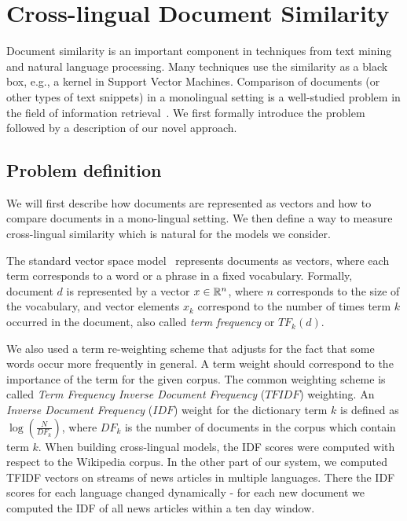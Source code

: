 %
\chapter{Cross-lingual Document Similarity}\label{chap:crosslingual}

Document similarity is an important component in techniques from text mining and natural language processing. 
Many techniques use the similarity as a black box, e.g., a kernel in Support Vector Machines. 
Comparison of documents (or other types of text snippets) in a monolingual setting is a 
well-studied problem in the field of information retrieval~\cite{Salton88term-weightingapproaches}. 
We first formally introduce the problem followed by a description of our novel approach.

\section{Problem definition}\label{chap:crosslingual:problem}
We will first describe how documents are represented as vectors and how to compare documents in 
a mono-lingual setting. We then define a way to measure cross-lingual similarity which is natural 
for the models we consider.

The standard vector space model~\cite{Salton88term-weightingapproaches} represents documents as 
vectors, where each term corresponds to a word or a phrase in a fixed vocabulary. Formally, 
document $d$ is represented by a vector $x \in \mathbb{R}^n$, where $n$ corresponds to the size 
of the vocabulary, and vector elements $x_k$ correspond to the number of times term $k$ 
occurred in the document, also called \emph{term frequency} or $TF_k(d)$.

We also used a term re-weighting scheme that adjusts for the fact that some words occur 
more frequently in general. A term weight should correspond to the importance of the term 
for the given corpus. The common weighting scheme is called \emph{Term Frequency Inverse 
Document Frequency} ($TFIDF$) weighting. An \emph{Inverse Document Frequency} ($IDF$) weight 
for the dictionary term $k$ is defined as $\log\left( \frac{N}{DF_k} \right)$, where 
$DF_k$ is the number of documents in the corpus which contain term $k$.
When building cross-lingual models, the IDF scores were computed with respect to the 
Wikipedia corpus. In the other part of our system, we computed TFIDF vectors on streams 
of news articles in multiple languages. There the IDF scores for each language changed 
dynamically - for each new document we computed the IDF of all news articles within 
a ten day window.

